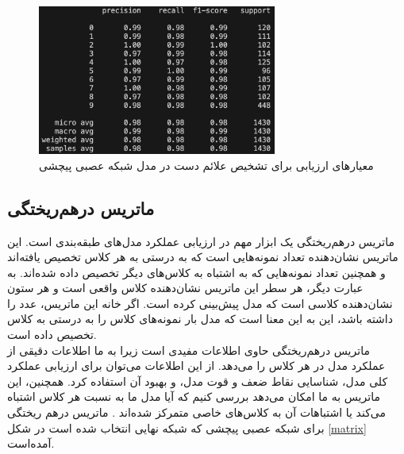 \begin{figure}[h]
    \centering
    \includegraphics[width=0.7\textwidth]{Report_CNN.png}
    \caption{ معیارهای ارزیابی برای تشخیص علائم دست در مدل شبکه عصبی پیچشی}
    \label{report}
\end{figure}



\subsection[ماتریس درهم‌ریختگی]{ماتریس درهم‌ریختگی\protect{}}
ماتریس درهم‌ریختگی یک ابزار مهم در ارزیابی عملکرد مدل‌های طبقه‌بندی است. این ماتریس نشان‌دهنده تعداد نمونه‌هایی است که به درستی به هر کلاس تخصیص یافته‌اند و همچنین تعداد نمونه‌هایی که به اشتباه به کلاس‌های دیگر تخصیص داده شده‌اند. به عبارت دیگر، هر سطر این ماتریس نشان‌دهنده کلاس واقعی است و هر ستون نشان‌دهنده کلاسی است که مدل پیش‌بینی کرده است. اگر خانه  این ماتریس، عدد  را داشته باشد، این به این معنا است که مدل  بار نمونه‌های کلاس  را به درستی به کلاس  تخصیص داده است.
\\
ماتریس درهم‌ریختگی حاوی اطلاعات مفیدی است زیرا به ما اطلاعات دقیقی از عملکرد مدل در هر کلاس را می‌دهد. از این اطلاعات می‌توان برای ارزیابی عملکرد کلی مدل، شناسایی نقاط ضعف و قوت مدل، و بهبود آن استفاده کرد. همچنین، این ماتریس به ما امکان می‌دهد بررسی کنیم که آیا مدل ما به نسبت هر کلاس اشتباه می‌کند یا اشتباهات آن به کلاس‌های خاصی متمرکز شده‌اند \cite{Confusio72:online}.
ماتریس درهم ریختگی برای شبکه عصبی پیچشی که شبکه نهایی انتخاب شده  است در شکل \ref{matrix} آمده‌است.

